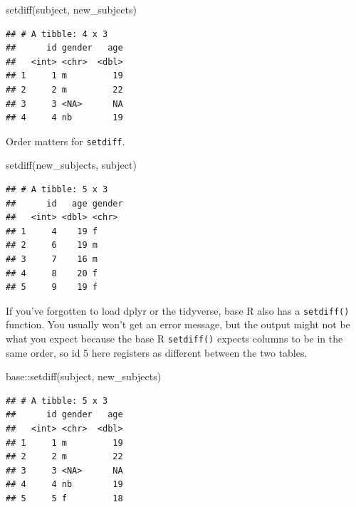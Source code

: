 \documentclass[
  oneside]{book}
\newenvironment{Shaded}{\begin{snugshade}}{\end{snugshade}}
\newcommand{\FunctionTok}[1]{\textcolor[rgb]{0.00,0.00,0.00}{#1}}
\newcommand{\NormalTok}[1]{#1}
\newcommand{\SpecialCharTok}[1]{\textcolor[rgb]{0.00,0.00,0.00}{#1}}
\begin{document}
\begin{Shaded}
\begin{Highlighting}[]
\FunctionTok{setdiff}\NormalTok{(subject, new\_subjects)}
\end{Highlighting}
\end{Shaded}

\begin{verbatim}
## # A tibble: 4 x 3
##      id gender   age
##   <int> <chr>  <dbl>
## 1     1 m         19
## 2     2 m         22
## 3     3 <NA>      NA
## 4     4 nb        19
\end{verbatim}

Order matters for \texttt{setdiff}.

\begin{Shaded}
\begin{Highlighting}[]
\FunctionTok{setdiff}\NormalTok{(new\_subjects, subject)}
\end{Highlighting}
\end{Shaded}

\begin{verbatim}
## # A tibble: 5 x 3
##      id   age gender
##   <int> <dbl> <chr> 
## 1     4    19 f     
## 2     6    19 m     
## 3     7    16 m     
## 4     8    20 f     
## 5     9    19 f
\end{verbatim}

\begin{warning}

If you've forgotten to load dplyr or the tidyverse, base R also has a \texttt{setdiff()} function. You usually won't get an error message, but the output might not be what you expect because the base R \texttt{setdiff()} expects columns to be in the same order, so id 5 here registers as different between the two tables.

\begin{Shaded}
\begin{Highlighting}[]
\NormalTok{base}\SpecialCharTok{::}\FunctionTok{setdiff}\NormalTok{(subject, new\_subjects)}
\end{Highlighting}
\end{Shaded}

\begin{verbatim}
## # A tibble: 5 x 3
##      id gender   age
##   <int> <chr>  <dbl>
## 1     1 m         19
## 2     2 m         22
## 3     3 <NA>      NA
## 4     4 nb        19
## 5     5 f         18
\end{verbatim}

\end{warning}
\end{document}
